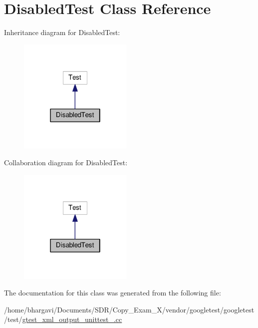 \hypertarget{class_disabled_test}{}\section{Disabled\+Test Class Reference}
\label{class_disabled_test}


Inheritance diagram for Disabled\+Test\+:
\nopagebreak
\begin{figure}[H]
\begin{center}
\leavevmode
\includegraphics[width=154pt]{class_disabled_test__inherit__graph}
\end{center}
\end{figure}


Collaboration diagram for Disabled\+Test\+:
\nopagebreak
\begin{figure}[H]
\begin{center}
\leavevmode
\includegraphics[width=154pt]{class_disabled_test__coll__graph}
\end{center}
\end{figure}


The documentation for this class was generated from the following file\+:\begin{DoxyCompactItemize}
\item 
/home/bhargavi/\+Documents/\+S\+D\+R/\+Copy\+\_\+\+Exam\+\_\+X/vendor/googletest/googletest/test/\hyperlink{gtest__xml__output__unittest___8cc}{gtest\+\_\+xml\+\_\+output\+\_\+unittest\+\_\+.\+cc}\end{DoxyCompactItemize}
